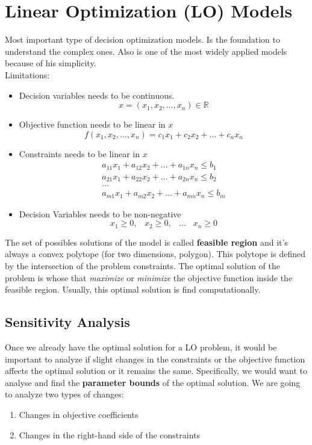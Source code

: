 \section{Linear Optimization (LO) Models}
Most important type of decision optimization models. Is the foundation to understand the complex ones. Also is one of the most widely
applied models because of his simplicity.\\

Limitations:
\begin{itemize}
    \item Decision variables needs to be continuous.
        \[x = (x_1, x_2, \dots , x_n) \in \mathbb{R}\]
    \item Objective function needs to be linear in $x$
        \[ f(x_1,x_2, \dots, x_n) = c_1x_1 + c_2x_2 + \dots + c_nx_n \]
    \item Constraints needs to be linear in $x$
        \begin{gather*}
            a_{11}x_1 + a_{12}x_2 + \dots + a_{1n}x_n \leq b_1 \\
            a_{21}x_1 + a_{22}x_2 + \dots + a_{2n}x_n \leq b_2 \\
            \dots\\
            a_{m1}x_1 + a_{m2}x_2 + \dots + a_{mn}x_n \leq b_m
        \end{gather*}
    \item Decision Variables needs to be non-negative
        \[ x_1 \geq 0,\;\;\; x_2 \geq 0,\;\;\; \dots\;\;\; x_n \geq 0 \]
\end{itemize}

The set of possibles solutions of the model is called \textbf{feasible region} and it's always a convex polytope (for two dimensions, polygon).
This polytope is defined by the intersection of the problem constraints. The optimal solution of the problem is whose that \textit{maximize} or 
\textit{minimize} the objective function inside the feasible region. Usually, this optimal solution is find computationally.\\

\subsection{Sensitivity Analysis}
Once we already have the optimal solution for a LO problem, it would be important to analyze if slight changes in the constraints or the objective function
affects the optimal solution or it remains the same. Specifically, we would want to analyse and find the \textbf{parameter bounds} of the optimal solution.
We are going to analyze two types of changes:
\begin{enumerate}
    \item Changes in objective coefficients
    \item Changes in the right-hand side of the constraints    
\end{enumerate}

